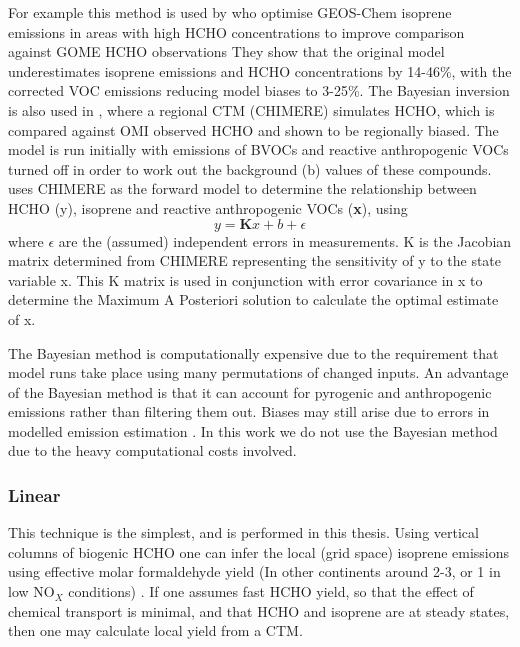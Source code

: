       
      For example this method is used by \textcite{Shim2005} who optimise GEOS-Chem isoprene emissions in areas with high HCHO concentrations to improve comparison against GOME HCHO observations %
      They show that the original model underestimates isoprene emissions and HCHO concentrations by 14-46\%, with the corrected VOC emissions reducing model biases to 3-25\%.
      The Bayesian inversion is also used in \textcite{Curci2010}, where a regional CTM (CHIMERE) simulates HCHO, which is compared against OMI observed HCHO and shown to be regionally biased.
      The model is run initially with emissions of BVOCs and reactive anthropogenic VOCs turned off in order to work out the background (b) values of these compounds.
      \textcite{Curci2010} uses CHIMERE as the forward model to determine the relationship between HCHO (y), isoprene and reactive anthropogenic VOCs (\textbf{x}), using 
      \begin{equation}
      y=\mathbf{K}x + b + \epsilon
      \end{equation}
      where $\epsilon$ are the (assumed) independent errors in measurements.
      K is the Jacobian matrix determined from CHIMERE representing the sensitivity of y to the state variable x.
      This K matrix is used in conjunction with error covariance in x to determine the Maximum A Posteriori solution to calculate the optimal estimate of x. %
      
      The Bayesian method is computationally expensive due to the requirement that model runs take place using many permutations of changed inputs.
      An advantage of the Bayesian method is that it can account for pyrogenic and anthropogenic emissions rather than filtering them out.
      Biases may still arise due to errors in modelled emission estimation \parencite{Curci2010}.
      In this work we do not use the Bayesian method due to the heavy computational costs involved.
      
        
    
    \subsubsection{Linear}
      \label{BioIsop:intro:top_down_linear}
      
      This technique is the simplest, and is performed in this thesis.
      Using vertical columns of biogenic HCHO one can infer the local (grid space) isoprene emissions using effective molar formaldehyde yield (In other continents around 2-3, or 1 in low NO$_X$ conditions) \parencite{Palmer2003,Marais2012,Bauwens2016}.
      If one assumes fast HCHO yield, so that the effect of chemical transport is minimal, and that HCHO and isoprene are at steady states, then one may calculate local yield from a CTM.
      
